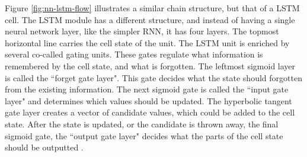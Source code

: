 Figure \ref{fig:nn-lstm-flow} illustrates a similar chain structure, but that of a LSTM cell. The LSTM module has a different structure, and instead of having a single neural network layer, like the simpler RNN, it has four layers. The topmost horizontal line carries the cell state of the unit. The LSTM unit is enriched by several co-called gating units. These gates regulate what information is remembered by the cell state, and what is forgotten. The leftmost sigmoid layer is called the ``forget gate layer". This gate decides what the state should forgotten from the existing information. The next sigmoid gate is called the ``input gate layer" and determines which values should be updated. The hyperbolic tangent gate layer creates a vector of candidate values, which could be added to the cell state. After the state is updated, or the candidate is thrown away, the final sigmoid gate, the ``output gate layer" decides what the parts of the cell state should be outputted \citep{hochreiter1997long, goodfellow2016deeplearning, olah2015lstm, gers2002learning}.